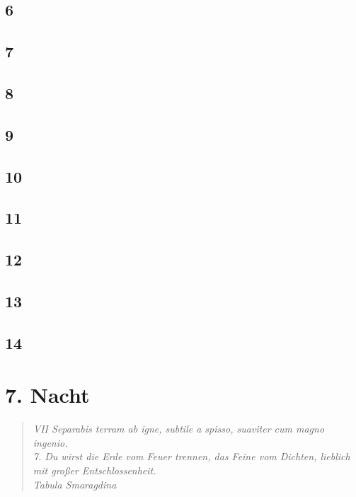 \section*{6}

\section*{7}

\section*{8}

\section*{9}

\section*{10}

\section*{11}

\section*{12}

\section*{13}

\section*{14}



\chapter*{7. Nacht}



\begin{quotation}

\emph{VII Separabis terram ab igne, subtile a spisso, suaviter cum magno ingenio.\\7. Du wirst die Erde vom Feuer trennen, das Feine vom Dichten, lieblich mit großer Entschlossenheit.  \\Tabula Smaragdina}

\end{quotation}



